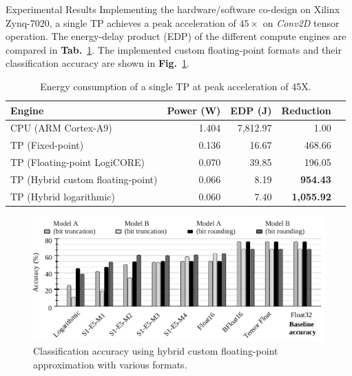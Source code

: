 \documentclass[final]{beamer}
\newlength{\onecolwid}
\newlength{\twocolwid}
\newcommand\fig[1]{\textbf{Fig.}~\ref{#1}}
\newcommand\tab[1]{\textbf{Tab.}~\ref{#1}}
\begin{document}
\begin{frame}[t]
\begin{columns}[t]
\begin{column}{\twocolwid}
\begin{columns}[t,totalwidth=\twocolwid]
\begin{column}{\onecolwid}
\begin{block}{Experimental Results}
	Implementing the hardware/software co-design on Xilinx Zynq-7020, a single TP achieves a peak acceleration of $45\times$ on \emph{Conv2D} tensor operation. The energy-delay product (EDP) of the different compute engines are compared in \tab{tab:energy}. The implemented custom floating-point formats and their classification accuracy are shown in \fig{fig:accuracy}.
	\begin{table}[!htp]\centering
		\caption{Energy consumption of a single TP at peak acceleration of 45X.}\label{tab:energy}
		\scriptsize
		\begin{tabular}{lrrrr}\toprule
			Engine &Power (W) &EDP (J) &Reduction \\\midrule
			CPU (ARM Cortex-A9)&1.404 &7,812.97 &1.00 \\
			TP (Fixed-point) &0.136 &16.67 &468.66 \\
			TP (Floating-point LogiCORE) &0.070 &39.85 &196.05 \\
			TP (Hybrid custom floating-point) &0.066 &8.19 &\textbf{954.43} \\
			TP (Hybrid logarithmic) &0.060 &7.40 &\textbf{1,055.92} \\
			\bottomrule
		\end{tabular}
	\end{table}
	
	\begin{figure}
		\includegraphics[width=\linewidth]{../figures/all_models_accuracy.pdf}
		\caption{Classification accuracy using hybrid custom floating-point approximation with various formats.}
		\label{fig:accuracy}
	\end{figure}
\end{block}


\end{column} %


\end{columns}
\end{column}
\end{columns}
\end{frame}
\end{document}
